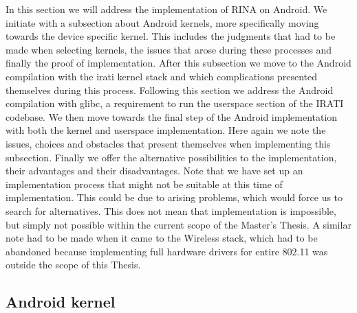 In this section we will address the implementation of RINA on Android. We initiate with a subsection about Android kernels, more specifically moving towards the device specific kernel. This includes the judgments that had to be made when selecting kernels, the issues that arose during these processes and finally the proof of implementation. After this subsection we move to the Android compilation with the irati kernel stack and which complications presented themselves during this process. Following this section we address the Android compilation with glibc, a requirement to run the userspace section of the IRATI codebase. We then move towards the final step of the Android implementation with both the kernel and userspace implementation. Here again we note the issues, choices and obstacles that present themselves when implementing this subsection. Finally we offer the alternative possibilities to the implementation, their advantages and their disadvantages. 
\npar
Note that we have set up an implementation process that might not be suitable at this time of implementation. This could be due to arising problems, which would force us to search for alternatives. This does not mean that implementation is impossible, but simply not possible within the current scope of the Master's Thesis. A similar note had to be made when it came to the Wireless stack, which had to be abandoned because implementing full hardware drivers for entire 802.11 was outside the scope of this Thesis. 

\subsection{Android kernel}

